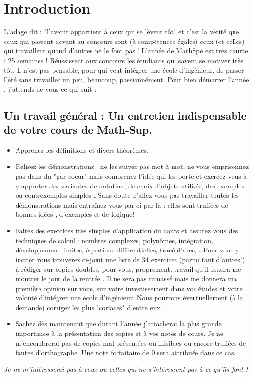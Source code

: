 \chapter*{Introduction}

L'adage dit : "l'avenir appartient à ceux qui se lèvent tôt" et c'est la vérité
que ceux qui passent devant au concours sont (à compétences égales) ceux (et
celles) qui travaillent quand d'autres ne le font pas !  L'année de MathSpé est
très courte : 25 semaines ! Réussissent aux concours les étudiants qui savent
se motiver très tôt. Il n'est pas pensable, pour qui veut intégrer une école
d'ingénieur, de passer l'été sans travailler un peu, beaucoup, passionnément.
Pour bien démarrer l'année , j'attends de vous ce qui suit :

\section[Un travail général]{Un travail général : Un entretien indispensable de
votre cours de Math-Sup.} 
\begin{itemize} 
	\item Apprenez les définitions et divers théorèmes.  
	\item Relisez les démonstrations : ne les suivez pas mot à mot, ne vous
		emprisonnez pas dans du "par coeur" mais comprenez l'idée qui
		les porte et exercez-vous à y apporter des variantes de
		notation, de choix d'objets utilisés, des exemples ou
		contrexemples simples \ldots Sans doute n'allez vous pas
		travailler toutes les démonstrations mais entraînez vous par-ci
		par-là : elles sont truffées de bonnes idées , d'exemples et de
		logique!  
	\item Faites des exercices très simples d'application du cours et
		assurez vous des techniques de calcul : nombres complexes,
		polynômes, intégration, développement limités, équations
		différentielles, tracé d'arcs, \ldots Pour vous y inciter vous
		trouverez ci-joint une liste de 34 exercices (parmi tant
		d'autres!) à rédiger sur copies doubles, pour vous, proprement,
		travail qu'il faudra me montrer le jour de la rentrée . Il ne
		sera pas ramassé mais me donnera ma première opinion sur vous,
		sur votre investissement dans vos études et votre volonté
		d'intégrer une école d'ingénieur. Nous pourrons éventuellement
		(à la demande) corriger les plus "coriaces" d'entre eux.  
	\item Sachez dès maintenant que durant l'année j'attacherai la plus
		grande importance à la présentation des copies et à vos notes
		de cours. Je ne m'encombrerai pas de copies mal présentées ou
		illisibles ou encore truffées de fautes d'orthographe. Une note
		forfaitaire de 0 sera attribuée dans ce cas. 
\end{itemize}
\emph{Je ne m'intéresserai pas à ceux ou celles qui ne s'intéressent pas à ce
qu'ils font !} 
